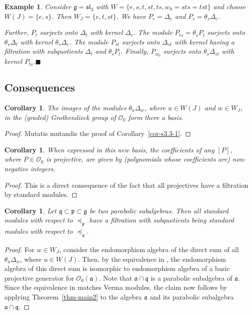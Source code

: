 \documentclass[a4paper]{amsart}
\newtheorem{corollary}[theorem]{Corollary}
\newtheorem{example}[theorem]{Example}
\begin{document}
\begin{example}
{\rm Consider $\mathfrak{g}=\mathfrak{sl}_3$
with $W=\{e,s,t,st,ts,w_0=sts=tst\}$ and choose
$W(J)=\{e,s\}$. Then $W_J=\{e,t,st\}$. We have
$P_e=\Delta_e$ and $P_s=\theta_s\Delta_e$.

Further, $P_t$ surjects onto $\Delta_t$ with kernel $\Delta_e$.
The module $P_{ts}=\theta_s P_t$ surjects onto
$\theta_s\Delta_t$ with kernel $\theta_s\Delta_e$.
The module $P_{st}$ surjects onto $\Delta_{st}$ with kernel
having a filtration with subquotients $\Delta_t$
and $\theta_s P_t$. Finally, $P_{w_0}$ surjects onto
$\theta_s\Delta_{st}$ with kernel $P_{ts}$.\hfill$\blacksquare$
}
\end{example}

\subsection{Consequences}\label{s4.5}


\begin{corollary}\label{cor-s4.5-1}
The images of the modules
$\theta_u\Delta_w$, 
where $u\in W(J)$ and $w\in W_J$,
in the (graded) Grothendieck group of $\mathcal{O}_0$
form there a basis. 
\end{corollary}

\begin{proof}
Mutatis mutandis the proof of Corollary~\ref{cor-s3.3-1}.
\end{proof}

\begin{corollary}\label{cor-s4.5-2}
When expressed in this new basis, the coefficients 
of any $[P]$, where $P\in \mathcal{O}_0$ is projective, 
are given by (polynomials whose coefficients are)
non-negative integers.
\end{corollary}

\begin{proof}
This is a direct consequence of the fact that all
projectives have a filtration by standard modules.
\end{proof}


\begin{corollary}\label{cor-s4.3-57}
Let $\mathfrak{q}\subset\mathfrak{p}\subset\mathfrak{g}$
be two parabolic subalgebras. Then all standard modules with respect to
$\preceq_{\mathfrak{p}}$ have a filtration with subquotients being
standard modules with respect to $\preceq_{\mathfrak{q}}$.
\end{corollary}

\begin{proof}
For $w\in W_J$, consider the endomorphism algebra of the direct sum of 
all $\theta_u\Delta_w$, where $u\in W(J)$. Then, by the 
equivalence in \cite[Theorem~37]{CMZ}, 
the endomorphism algebra of this direct sum is isomorphic to 
endomorphism algebra of a basic projective generator for
$\mathcal{O}_0(\mathfrak{a})$. Note that 
$\mathfrak{a}\cap\mathfrak{q}$ is a parabolic subalgebra
of $\mathfrak{a}$. Since the equivalence in \cite[Theorem~37]{CMZ}
matches Verma modules, the claim now follows by applying 
Theorem~\ref{thm-main2} to the algebra $\mathfrak{a}$
and its parabolic subalgebra $\mathfrak{a}\cap\mathfrak{q}$.
\end{proof}
\end{document}
